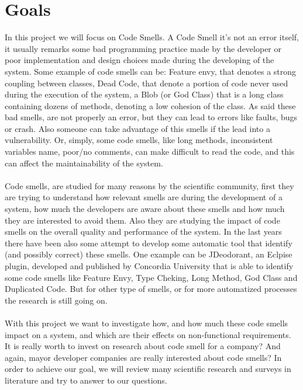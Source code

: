 \documentclass[]{article}
\begin{document}
\section{Goals}

In this project we will focus on Code Smells. A Code Smell it's not an error itself, it usually remarks some bad programming practice made by the developer or poor implementation and design choices made during the developing of the system. Some example of code smells can be: Feature envy, that denotes a strong coupling between classes, Dead Code, that denote a portion of code never used during the execution of the system, a Blob (or God Class) that is a long class containing dozens of methods, denoting a low cohesion of the class. As said these bad smells, are not properly an error, but they can lead to errors like faults, bugs or crash. Also someone can take advantage of this smells if the lead into a vulnerability. Or, simply, some code smells, like long methods, inconsistent variables name, poor/no comments, can make difficult to read the code, and this can affect the maintainability of the system. \\
\\
Code smells, are studied for many reasons by the scientific community, first they are trying to understand how relevant smells are during the development of a system, how much the developers are aware about these smells and how much they are interested to avoid them. Also they are studying the impact of code smells on the overall quality and performance of the system. In the last years there have been also some attempt to develop some automatic tool that identify (and possibly correct) these smells. One example can be JDeodorant, an Eclpise plugin, developed and published by Concordia University that is able to identify some code smells like Feature Envy, Type Cheking, Long Method, God Class and Duplicated Code. But for other type of smells, or for more automatized processes the research is still going on.
\\\\
With this project we want to investigate how, and how much these code smells impact on a system, and which are their effects on non-functional requirements. It is really worth to invest on research about code smell for a company? And again, mayor developer companies are really interested about code smells? In order to achieve our goal, we will review many scientific research and surveys in literature and try to answer to our questions.
\end{document}
